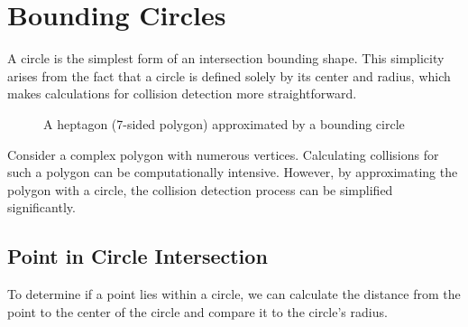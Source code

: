 \section{Bounding Circles}
A circle is the simplest form of an intersection bounding shape. This
simplicity arises from the fact that a circle is defined solely by its center
and radius, which makes calculations for collision detection more
straightforward.
\begin{figure}[H]
    \begin{center}
    \end{center}
    \caption{A heptagon (7-sided polygon) approximated by a bounding circle}
\end{figure}

Consider a complex polygon with numerous vertices. Calculating collisions for
such a polygon can be computationally intensive. However, by approximating the
polygon with a circle, the collision detection process can be simplified
significantly.

\subsection{Point in Circle Intersection}
To determine if a point lies within a circle, we can calculate the distance
from the point to the center of the circle and compare it to the circle's
radius.


